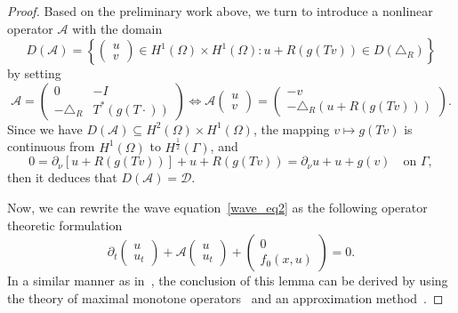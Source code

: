 \documentclass{elsarticle}
\begin{document}
\begin{proof}
Based on the preliminary work above, we turn to introduce a nonlinear operator $\mathcal{A}$ with the domain
 \begin{equation*}
D(\mathcal{A}) = \left\{ 
\left(
\begin{array}{c}
u \\
v
\end{array}
\right)
\in H^1(\Omega)\times H^1(\Omega): u+R\left( g(T v)\right)\in D(\triangle_R)
\right\}
\end{equation*}
by setting 
 \begin{equation}\label{mono_operator}
\mathcal{A }=
\left(
\begin{array}{cc}
0 & -I\\
-\triangle_R & T^\ast \left( g(T\cdot)\right)
\end{array}
\right)
 \Longleftrightarrow
\mathcal{A}
\left(
\begin{array}{c}
u \\
v
\end{array}
\right)
=
\left(
\begin{array}{c}
-v\\
-\triangle_R(u+R\left( g(T v)\right)) 
\end{array}
\right).
\end{equation}
Since we have $D(\mathcal{A})\subseteq H^2(\Omega)\times H^1(\Omega)$, the mapping $v\mapsto  g(Tv)$ is continuous from $H^1(\Omega)$ to $H^{\frac{1}{2}}(\Gamma)$, and
\[
	0= \partial_{\nu}[u+R\left( g(T v)\right)] + u+R\left( g(T v)\right)= \partial_{\nu} u + u + g(v) \quad \textrm{on $\Gamma$},
\]
then it deduces that $D(\mathcal{A}) =\mathcal{D}$. 

Now, we can rewrite the wave equation~\eqref{wave_eq2} as the following operator theoretic formulation 
\begin{equation}\label{evolution_eq}
\partial_t\left(
\begin{array}{c}
u \\
u_t
\end{array}
\right)
+\mathcal{A}
\left(
\begin{array}{c}
u \\
u_t
\end{array}
\right)
+
\left(
\begin{array}{c}
0 \\
f_0(x, u)
\end{array}
\right)
=0.
\end{equation}
In a similar manner as in~\cite{CEL2002}, the conclusion of this lemma can be derived by using the theory of maximal monotone operators~\cite{Barbu2010} and an approximation method~\cite{LT1993}.
\end{proof}
\end{document}

